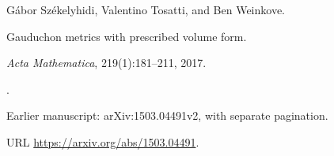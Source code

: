 G\'abor Sz\'ekelyhidi, Valentino Tosatti, and Ben Weinkove.

\newblock Gauduchon metrics with prescribed volume form.

\newblock \emph{Acta Mathematica}, 219(1):181--211, 2017.

\newblock {}.

\newblock Earlier manuscript: arXiv:1503.04491v2, with separate pagination.

\newblock URL \url{https://arxiv.org/abs/1503.04491}.
